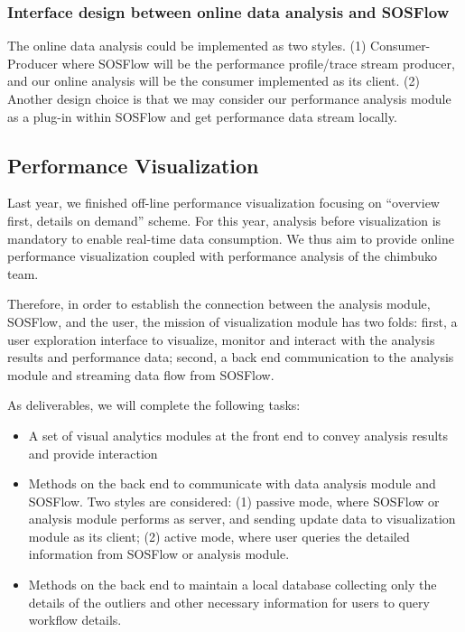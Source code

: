 \subsubsection{Interface design between online data analysis and SOSFlow}
The online data analysis could be implemented as two styles. (1) Consumer-Producer where SOSFlow will be the performance profile/trace stream producer, and our online analysis will be the consumer implemented as its client. (2) Another design choice is that we may consider our performance analysis module as a plug-in within SOSFlow and get performance data stream locally.
\subsection{Performance Visualization}
Last year, we finished off-line performance visualization focusing on ``overview first, details on demand'' scheme. For this year, analysis before visualization is mandatory to enable real-time data consumption. We thus aim to provide online performance visualization coupled with performance analysis of the chimbuko team.

Therefore, in order to establish the connection between the analysis module, SOSFlow, and the user, the mission of visualization module has two folds: first, a user exploration interface to visualize, monitor and interact with the analysis results and performance data; second, a back end communication to the analysis module and streaming data flow from SOSFlow. 

As deliverables, we will complete the following tasks:
\begin{itemize}
\item A set of visual analytics modules at the front end to convey analysis results and provide interaction
\item Methods on the back end to communicate with data analysis module and SOSFlow. Two styles are considered: (1) passive mode, where SOSFlow or analysis module performs as server, and sending update data to visualization module as its client; (2) active mode, where user queries the detailed information from SOSFlow or analysis module. 
\item Methods on the back end to maintain a local database collecting only the details of the outliers and other necessary information for users to query workflow details.
\end{itemize}

